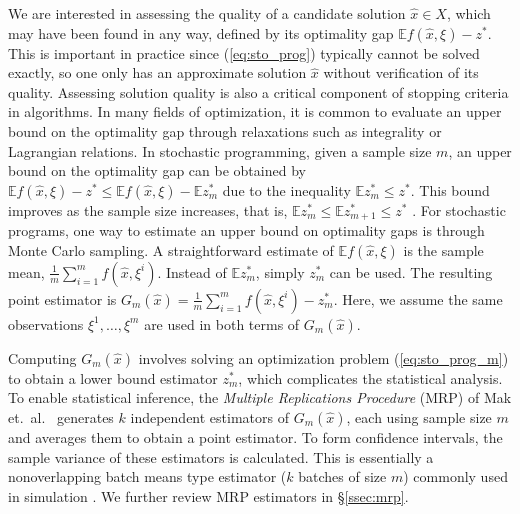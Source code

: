 \documentclass{article}
\newcommand{\e}[1]{\mathbb{E} %
#1 %
}
\newcommand{\x}{x} %
\newcommand{\xh}{{\hat{\x}}}
\newcommand{\xit}{\xi}  %
\newcommand{\xiti}{\xit^i}
\newcommand{\zs}{z^*}
\begin{document}
We are interested in assessing the quality of a candidate solution $\xh \in X$, which may have been found in any way, defined by its optimality gap $\e{f(\xh,\xit)} - \zs$.  
This is important in practice since (\ref{eq:sto_prog}) typically cannot be solved exactly, so one only has an approximate solution $\xh$ without verification of its quality.  
Assessing solution quality is also a critical component of stopping criteria in algorithms.  
In many fields of optimization, it is common to evaluate an upper bound on the optimality gap through relaxations such as integrality or Lagrangian relations.  
In stochastic programming, given a sample size $m$, an upper bound on the optimality gap can be obtained by $\e{f(\xh,\xit)} - \zs \leq \e{f(\xh,\xit)} - \e{\zs_m}$ due to the inequality $\e{\zs_m} \leq \zs$.  
This bound improves as the sample size increases, that is, $\e{\zs_m} \leq \e{\zs_{m+1}} \leq \zs$ \cite{Mak1999,norkin_pflug_ruszczynski_98}.  
For stochastic programs, one way to estimate an upper bound on optimality gaps is through Monte Carlo sampling. 
A straightforward estimate of $\e{f(\xh,\xit)}$ is the sample mean, $\frac{1}{m} \sum_{i=1}^m f(\xh,\xiti)$. 
Instead of $\e{\zs_m}$, simply $\zs_m$ can be used.  
The resulting point estimator is  $G_m(\xh) = \frac{1}{m} \sum_{i=1}^m f(\xh,\xiti) - \zs_m$.  
Here, we assume the same observations $\xit^1, \dots, \xit^m$ are used in both terms of $G_m(\xh)$.  

Computing $G_m(\xh)$ involves solving an optimization problem (\ref{eq:sto_prog_m}) to obtain a lower bound estimator $\zs_m$, which complicates the statistical analysis. 
To enable statistical inference, the \emph{Multiple Replications Procedure} (MRP) of Mak et.\ al.\ \cite{Mak1999} generates $k$ independent estimators of $G_m(\xh)$, each using sample size $m$ and averages them to obtain a point estimator.  
To form confidence intervals, the sample variance of these estimators is calculated.  
This is essentially a nonoverlapping batch means type estimator ($k$ batches of size $m$) commonly used in simulation \cite{law_07}. 
We further review MRP estimators in \S \ref{ssec:mrp}.
\end{document}
